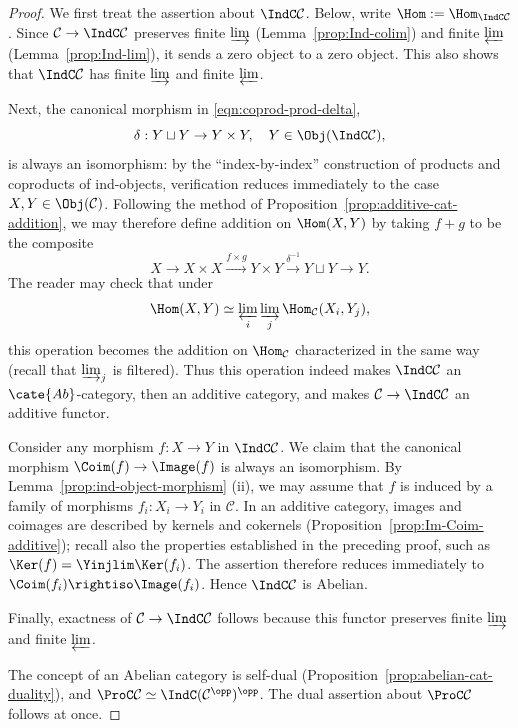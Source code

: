 \begin{proof}
	We first treat the assertion about $\IndC\mathcal{C}$. Below, write $\Hom:=\Hom_{\IndC\mathcal{C}}$. Since $\mathcal{C}\to\IndC\mathcal{C}$ preserves finite $\varinjlim$ (Lemma~\ref{prop:Ind-colim}) and finite $\varprojlim$ (Lemma~\ref{prop:Ind-lim}), it sends a zero object to a zero object. This also shows that $\IndC\mathcal{C}$ has finite $\varinjlim$ and finite $\varprojlim$.

	Next, the canonical morphism in \eqref{eqn:coprod-prod-delta},
	\[ \delta: Y \sqcup Y \to Y \times Y, \quad Y \in \Obj(\IndC\mathcal{C}), \]
	is always an isomorphism: by the ``index-by-index'' construction of products and coproducts of ind-objects, verification reduces immediately to the case $X,Y\in\Obj(\mathcal{C})$. Following the method of Proposition~\ref{prop:additive-cat-addition}, we may therefore define addition on $\Hom(X,Y)$ by taking $f+g$ to be the composite
	\[ X \to X \times X \xrightarrow{f \times g} Y \times Y \xrightarrow{\delta^{-1}} Y \sqcup Y \to Y. \]
	The reader may check that under
	\[ \Hom(X,Y)\simeq\varprojlim_i\varinjlim_j\Hom_{\mathcal{C}}(X_i,Y_j), \]
	this operation becomes the addition on $\Hom_{\mathcal{C}}$ characterized in the same way (recall that $\varinjlim_j$ is filtered). Thus this operation indeed makes $\IndC\mathcal{C}$ an $\cate{Ab}$-category, then an additive category, and makes $\mathcal{C}\to\IndC\mathcal{C}$ an additive functor.

	Consider any morphism $f:X\to Y$ in $\IndC\mathcal{C}$. We claim that the canonical morphism $\Coim(f)\to\Image(f)$ is always an isomorphism. By Lemma~\ref{prop:ind-object-morphism} (ii), we may assume that $f$ is induced by a family of morphisms $f_i:X_i\to Y_i$ in $\mathcal{C}$. In an additive category, images and coimages are described by kernels and cokernels (Proposition~\ref{prop:Im-Coim-additive}); recall also the properties established in the preceding proof, such as $\Ker(f)=\Yinjlim\Ker(f_i)$. The assertion therefore reduces immediately to $\Coim(f_i)\rightiso\Image(f_i)$. Hence $\IndC\mathcal{C}$ is Abelian.

	Finally, exactness of $\mathcal{C}\to\IndC\mathcal{C}$ follows because this functor preserves finite $\varinjlim$ and finite $\varprojlim$.

	The concept of an Abelian category is self-dual (Proposition~\ref{prop:abelian-cat-duality}), and $\ProC\mathcal{C}\simeq\IndC(\mathcal{C}^{\opp})^{\opp}$. The dual assertion about $\ProC\mathcal{C}$ follows at once.
\end{proof}

